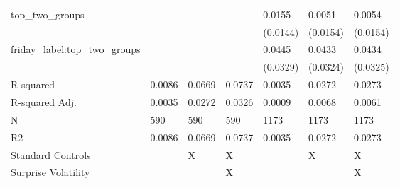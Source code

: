 \begin{tabular}{lllllll}
top_two_groups &  &  &  & 0.0155 & 0.0051 & 0.0054 \\
 &  &  &  & (0.0144) & (0.0154) & (0.0154) \\
friday_label:top_two_groups &  &  &  & 0.0445 & 0.0433 & 0.0434 \\
 &  &  &  & (0.0329) & (0.0324) & (0.0325) \\
R-squared & 0.0086 & 0.0669 & 0.0737 & 0.0035 & 0.0272 & 0.0273 \\
R-squared Adj. & 0.0035 & 0.0272 & 0.0326 & 0.0009 & 0.0068 & 0.0061 \\
N & 590 & 590 & 590 & 1173 & 1173 & 1173 \\
R2 & 0.0086 & 0.0669 & 0.0737 & 0.0035 & 0.0272 & 0.0273 \\
Standard Controls &  & X & X &  & X & X \\
Surprise Volatility &  &  & X &  &  & X \\
\bottomrule
\end{tabular}
